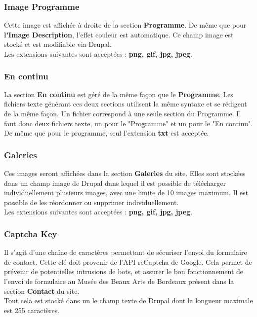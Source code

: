\documentclass[11pt]{report}
\begin{document}
\subsubsection{Image Programme}

Cette image est affichée à droite de la section \textbf{Programme}. De même que
pour \textbf{l'Image Description}, l'effet couleur est automatique.
Ce champ image est stocké et est modifiable via Drupal. \\
Les extensions suivantes sont acceptées : \textbf{png, gif, jpg, jpeg}.

\subsubsection{En continu}

La section \textbf{En continu} est géré de la même façon que le \textbf{Programme}.
Les fichiers texte générant ces deux sections utilisent la même syntaxe et se
rédigent de la même façon. Un fichier correspond à une seule section du Programme.
Il faut donc deux fichiers texte, un pour le "Programme" et un pour le "En continu".
De même que pour le programme, seul l'extension \textbf{txt} est acceptée.

\subsubsection{Galeries}

Ces images seront affichées dans la section \textbf{Galeries} du site. Elles sont
stockées dans un champ image de Drupal dans lequel il est possible de télécharger
individuellement plusieurs images, avec une limite de 10 images maximum.
Il est possible de les réordonner ou supprimer individuellement. \\
Les extensions suivantes sont acceptées : \textbf{png, gif, jpg, jpeg}.

\subsubsection{Captcha Key}

Il s'agit d'une chaîne de caractères permettant de sécuriser l'envoi du formulaire
de contact. Cette clé doit provenir de l'API reCaptcha de Google. Cela permet de
prévenir de potentielles intrusions de bots, et assurer le bon fonctionnement
de l'envoi de formulaire au Musée des Beaux Arts de Bordeaux présent dans la
section \textbf{Contact} du site.\\
Tout cela est stocké dans un le champ texte de Drupal dont la longueur maximale
est 255 caractères.
\end{document}
